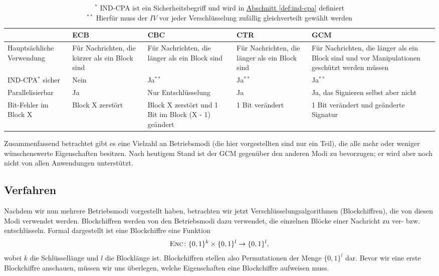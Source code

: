 \begin{table}[h]
\centering
	\begin{tabularx}{\textwidth}{ | X | X | X | X | X |} 
		\hline
		  & ECB & CBC & CTR & GCM \\ 
		\hline
		Hauptsächliche Verwendung & Für Nachrichten, die kürzer als ein Block sind & Für Nachrichten, die länger als ein Block sind 
		& Für Nachrichten, die länger als ein Block sind & Für Nachrichten, die länger als ein Block sind und vor Manipulationen geschützt werden müssen \\ 
		\hline
		\parbox{3cm}{IND-CPA\(^{\ast}\) } sicher & Nein & Ja\(^{\ast\ast}\) & Ja\(^{\ast\ast}\) & Ja\(^{\ast\ast}\) \\
		\hline
		 Parallelisierbar & Ja & Nur Entschlüsselung  & Ja & Ja, das Signieren selbst aber nicht \\ 
		\hline
		Bit-Fehler im Block X & Block X zerstört & Block X zerstört und 1 Bit im Block (X - 1) geändert 
		& 1 Bit verändert & 1 Bit verändert und geänderte Signatur \\
		\hline
	\end{tabularx}
	\caption{\(^{\ast}\) IND-CPA ist ein Sicherheitsbegriff und wird in \hyperref[def:ind-cpa]{Abschnitt \ref{def:ind-cpa}} definiert \\ 
		\(^{\ast\ast}\) Hierfür muss der \(IV\) vor jeder Verschlüsselung zufällig gleichverteilt gewählt werden}
\end{table}

\captionsetup[table]{labelformat=default}
\captionsetup[table]{singlelinecheck=true}
\captionsetup{font=normal}
 
\bigskip

Zusammenfassend betrachtet gibt es eine Vielzahl an Betriebsmodi (die hier vorgestellten sind nur ein Teil), die alle mehr oder weniger wünschenswerte Eigenschaften besitzen. Nach heutigem Stand ist der GCM gegenüber den anderen Modi zu bevorzugen; er wird aber noch nicht von allen Anwendungen unterstützt.

\subsection{Verfahren}
Nachdem wir nun mehrere Betriebsmodi vorgestellt haben, betrachten wir jetzt Verschlüsselungsalgorithmen (Blockchiffren), die von diesen Modi verwendet werden. Blockchiffren werden von den Betriebsmodi dazu verwendet, die einzelnen Blöcke einer Nachricht zu ver- bzw. entschlüsseln. Formal dargestellt ist eine Blockchiffre eine Funktion
\begin{align*}
	\textsc{Enc} \colon \{0, 1\}^k \times \{0, 1\}^l \rightarrow \{0, 1\}^l,
\end{align*}
wobei \(k\) die Schlüssellänge und \(l\) die Blocklänge ist. Blockchiffren stellen also Permutationen der Menge 
\(\{0, 1\}^l\) dar.
Bevor wir eine erste Blockchiffre anschauen, müssen wir uns überlegen, welche Eigenschaften eine Blockchiffre aufweisen muss.

